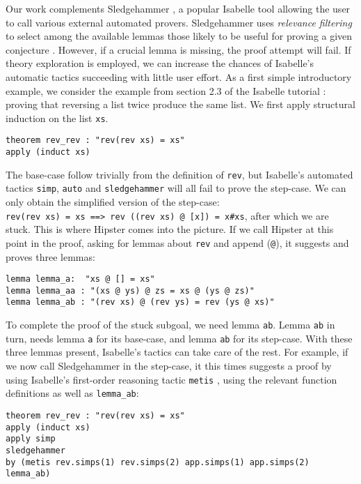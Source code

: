 Our work complements Sledgehammer \cite{sledgehammer}, a popular Isabelle tool allowing the user to call various external automated provers. Sledgehammer uses \emph{relevance filtering} to select among the available lemmas those likely to be useful for proving a given conjecture \cite{mash}. However, if a crucial lemma is missing, the proof attempt will fail. If theory exploration is employed, we can increase the chances of Isabelle's automatic tactics succeeding with little user effort. As a first simple introductory example, we consider the example from section 2.3 of the Isabelle tutorial \cite{isabelle}: proving that reversing a list twice produce the same list. We first apply structural induction on the list \texttt{xs}.
\begin{verbatim}
theorem rev_rev : "rev(rev xs) = xs"
apply (induct xs)
\end{verbatim}
The base-case follow trivially from the definition of \texttt{rev},
but Isabelle's automated tactics \texttt{simp}, \texttt{auto} and
\texttt{sledgehammer} will all fail to prove the step-case. We can
only obtain the simplified version of the step-case: \\\texttt{rev(rev
  xs) = xs ==> rev ((rev xs) @ [x]) = x\#xs}, after which we are stuck.
This is where Hipster comes into the picture. If we call Hipster at
this point in the proof, asking for lemmas about \texttt{rev} and
append (\texttt{@}), it suggests and proves three lemmas:
\begin{verbatim}
lemma lemma_a:  "xs @ [] = xs"
lemma lemma_aa : "(xs @ ys) @ zs = xs @ (ys @ zs)"
lemma lemma_ab : "(rev xs) @ (rev ys) = rev (ys @ xs)"
\end{verbatim}
To complete the proof of the stuck subgoal, we need lemma \texttt{ab}. Lemma \texttt{ab} in turn, needs lemma \texttt{a} for its base-case, and lemma \texttt{ab} for its step-case. With these three lemmas present, Isabelle's tactics can take care of the rest. For example, if we now call Sledgehammer in the step-case, it this times suggests a proof by using Isabelle's first-order reasoning tactic \texttt{metis} \cite{metis}, using the relevant function definitions as well as \texttt{lemma\_ab}:
\begin{small}
\begin{verbatim}
theorem rev_rev : "rev(rev xs) = xs"
apply (induct xs)
apply simp
sledgehammer
by (metis rev.simps(1) rev.simps(2) app.simps(1) app.simps(2) lemma_ab)
\end{verbatim}
\end{small}


